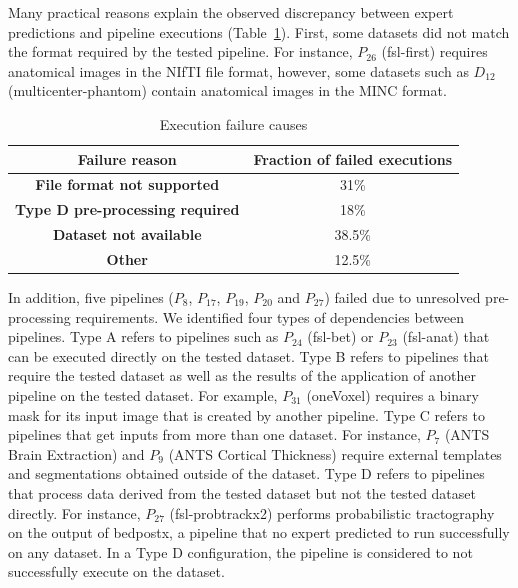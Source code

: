 \documentclass[conference]{IEEEtran}
\begin{document}
Many practical reasons explain the observed discrepancy between expert
predictions and pipeline executions (Table~\ref{tab1}). First, some
datasets did not match the format required by the tested pipeline. For
instance, $P_{26}$ (fsl-first) requires anatomical images in the NIfTI file
format, however, some datasets such as $D_{12}$ (multicenter-phantom)
contain anatomical images in the MINC format.

\begin{table}[htbp]
    \caption{Execution failure causes}
    \begin{center}
        \begin{tabular}{cc}
            \hline
            \textbf{Failure reason} & \textbf{Fraction of failed executions}  \\
            \hline
            \textbf{File format not supported}    & 31\% \\
            \textbf{Type D pre-processing required}    & 18\% \\
            \textbf{Dataset not available}         & 38.5\% \\
            \textbf{Other}       & 12.5\% \\
            \hline
        \end{tabular}
        \label{tab1}
    \end{center}
\end{table}

In addition, five pipelines ($P_{8}$, $P_{17}$, $P_{19}$, $P_{20}$ and
$P_{27}$) failed due to unresolved pre-processing requirements. We
identified four types of dependencies between pipelines. Type A refers to pipelines such
as $P_{24}$ (fsl-bet) or $P_{23}$ (fsl-anat) that can be executed directly
on the tested dataset. Type B refers to pipelines that require the tested
dataset as well as the results of the application of another pipeline on
the tested dataset. For example, $P_{31}$ (oneVoxel) requires a binary mask
for its input image that is created by another pipeline. Type C refers
to pipelines that get inputs from more than one dataset. For instance, $P_7$
(ANTS Brain Extraction) and $P_9$ (ANTS Cortical Thickness) require
external templates and segmentations obtained outside of the dataset. Type
D refers to pipelines that process data derived from the tested dataset but not
the tested dataset directly.  For instance, $P_{27}$ (fsl-probtrackx2) performs
probabilistic tractography on the output of bedpostx, a pipeline that
no expert predicted to run successfully on any dataset. In a Type D
configuration, the pipeline is considered to not successfully execute on
the dataset. 
\end{document}
